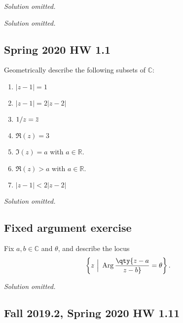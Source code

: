 \emph{Solution omitted.}

\emph{Solution omitted.}

\hypertarget{spring-2020-hw-1.1}{%
\subsection{Spring 2020 HW 1.1}\label{spring-2020-hw-1.1}}

\begin{problem}[?]

Geometrically describe the following subsets of \({\mathbb{C}}\):

\begin{enumerate}
\def\labelenumi{\alph{enumi}.}
\tightlist
\item
  \({\left\lvert {z-1} \right\rvert} = 1\)
\item
  \({\left\lvert {z-1} \right\rvert} = 2{\left\lvert {z-2} \right\rvert}\)
\item
  \(1/z = \mkern 1.5mu\overline{\mkern-1.5muz\mkern-1.5mu}\mkern 1.5mu\)
\item
  \(\Re(z) = 3\)
\item
  \(\Im(z) = a\) with \(a\in {\mathbb{R}}\).
\item
  \(\Re(z) > a\) with \(a\in {\mathbb{R}}\).
\item
  \({\left\lvert {z-1} \right\rvert} < 2{\left\lvert {z-2} \right\rvert}\)
\end{enumerate}

\end{problem}

\emph{Solution omitted.}

\hypertarget{fixed-argument-exercise}{%
\subsection{Fixed argument exercise}\label{fixed-argument-exercise}}

\begin{exercise}[?]

Fix \(a,b\in {\mathbb{C}}\) and \(\theta\), and describe the locus
\begin{align*}
\left\{{z{~\mathrel{\Big\vert}~}\operatorname{Arg}\qty{z-a\over z-b} = \theta}\right\}
.\end{align*}

\end{exercise}

\emph{Solution omitted.}

\hypertarget{fall-2019.2-spring-2020-hw-1.11}{%
\subsection{Fall 2019.2, Spring 2020 HW
1.11}\label{fall-2019.2-spring-2020-hw-1.11}}

